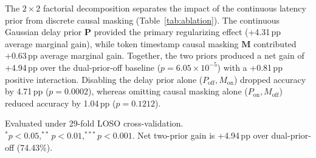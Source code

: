 \documentclass[journal]{IEEEtran}
\begin{document}
The $2 \times 2$ factorial decomposition separates the impact of the continuous latency prior from discrete causal masking (Table~\ref{tab:ablation}). The continuous Gaussian delay prior $\mathbf{P}$ provided the primary regularizing effect (+4.31\,pp average marginal gain), while token timestamp causal masking $\mathbf{M}$ contributed +0.63\,pp average marginal gain. Together, the two priors produced a net gain of +4.94\,pp over the dual-prior-off baseline ($p = 6.05\times 10^{-5}$) with a +0.81\,pp positive interaction. Disabling the delay prior alone ($P_{\mathrm{off}}, M_{\mathrm{on}}$) dropped accuracy by 4.71\,pp ($p = 0.0002$), whereas omitting causal masking alone ($P_{\mathrm{on}}, M_{\mathrm{off}}$) reduced accuracy by 1.04\,pp ($p = 0.1212$).

\begin{table}[!t]
\centering
\caption{Ablation analysis and $2 \times 2$ factorial decomposition of delay prior $\mathbf{P}$ and causal mask $\mathbf{M}$ on the TU Berlin benchmark.}
\label{tab:ablation}
\par\smallskip
{\scriptsize Evaluated under 29-fold LOSO cross-validation. $^{*}p<0.05, ^{**}p<0.01, ^{***}p<0.001$. Net two-prior gain is +4.94\,pp over dual-prior-off (74.43\%).}
\end{table}
\end{document}
